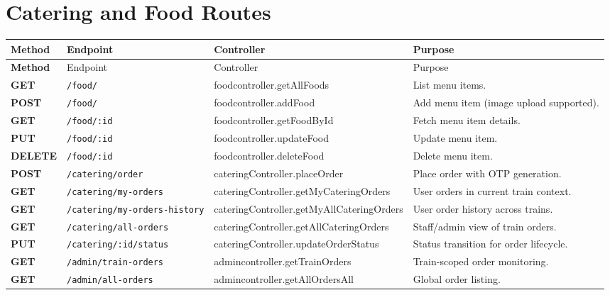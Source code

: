 \documentclass[12pt,a4paper]{report}
\begin{document}
\section{Catering and Food Routes}
\begin{longtable}{>{\bfseries}p{} p{} p{} p{}}
\toprule
\rowcolor{TableHeader}
\textcolor{TableHeaderText}{Method} & \textcolor{TableHeaderText}{Endpoint} & \textcolor{TableHeaderText}{Controller} & \textcolor{TableHeaderText}{Purpose} \\
\midrule
\endfirsthead
\toprule
\rowcolor{TableHeader}
\textcolor{TableHeaderText}{Method} & \textcolor{TableHeaderText}{Endpoint} & \textcolor{TableHeaderText}{Controller} & \textcolor{TableHeaderText}{Purpose} \\
\midrule
\endhead
GET & \texttt{/food/} & foodcontroller.getAllFoods & List menu items. \\
POST & \texttt{/food/} & foodcontroller.addFood & Add menu item (image upload supported). \\
GET & \texttt{/food/:id} & foodcontroller.getFoodById & Fetch menu item details. \\
PUT & \texttt{/food/:id} & foodcontroller.updateFood & Update menu item. \\
DELETE & \texttt{/food/:id} & foodcontroller.deleteFood & Delete menu item. \\
POST & \texttt{/catering/order} & cateringController.placeOrder & Place order with OTP generation. \\
GET & \texttt{/catering/my-orders} & cateringController.getMyCateringOrders & User orders in current train context. \\
GET & \texttt{/catering/my-orders-history} & cateringController.getMyAllCateringOrders & User order history across trains. \\
GET & \texttt{/catering/all-orders} & cateringController.getAllCateringOrders & Staff/admin view of train orders. \\
PUT & \texttt{/catering/:id/status} & cateringController.updateOrderStatus & Status transition for order lifecycle. \\
GET & \texttt{/admin/train-orders} & admincontroller.getTrainOrders & Train-scoped order monitoring. \\
GET & \texttt{/admin/all-orders} & admincontroller.getAllOrdersAll & Global order listing. \\
\bottomrule
\end{longtable}
\end{document}
